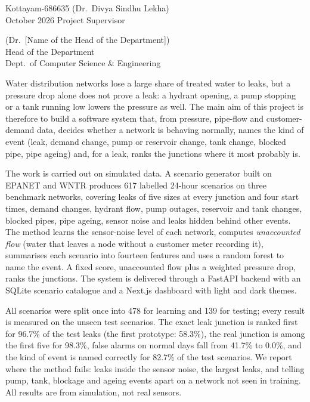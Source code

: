 \documentclass[11pt,letterpaper]{report}
\theoremstyle{definition}
\theoremstyle{plain}
\theoremstyle{remark}
\begin{document}
\noindent Kottayam-686635 \hfill (Dr.\ Divya Sindhu Lekha)\\
October 2026 \hfill Project Supervisor

\vspace{0.9in}
\begin{flushright}
(Dr.\ [Name of the Head of the Department])\\
Head of the Department\\
Dept.\ of Computer Science \& Engineering
\end{flushright}
\clearpage

\begin{center}\vspace*{0.7in}{\large\bfseries ABSTRACT}\end{center}
\vspace{0.1in}
\linespread{1.3}\selectfont
Water distribution networks lose a large share of treated water to leaks, but a pressure drop alone does not prove a leak: a hydrant opening, a pump stopping or a tank running low lowers the pressure as well. The main aim of this project is therefore to build a software system that, from pressure, pipe-flow and customer-demand data, decides whether a network is behaving normally, names the kind of event (leak, demand change, pump or reservoir change, tank change, blocked pipe, pipe ageing) and, for a leak, ranks the junctions where it most probably is.

The work is carried out on simulated data. A scenario generator built on EPANET and WNTR produces 617 labelled 24-hour scenarios on three benchmark networks, covering leaks of five sizes at every junction and four start times, demand changes, hydrant flow, pump outages, reservoir and tank changes, blocked pipes, pipe ageing, sensor noise and leaks hidden behind other events. The method learns the sensor-noise level of each network, computes \emph{unaccounted flow} (water that leaves a node without a customer meter recording it), summarises each scenario into fourteen features and uses a random forest to name the event. A fixed score, unaccounted flow plus a weighted pressure drop, ranks the junctions. The system is delivered through a FastAPI backend with an SQLite scenario catalogue and a Next.js dashboard with light and dark themes.

All scenarios were split once into 478 for learning and 139 for testing; every result is measured on the unseen test scenarios. The exact leak junction is ranked first for 96.7\% of the test leaks (the first prototype: 58.3\%), the real junction is among the first five for 98.3\%, false alarms on normal days fall from 41.7\% to 0.0\%, and the kind of event is named correctly for 82.7\% of the test scenarios. We report where the method fails: leaks inside the sensor noise, the largest leaks, and telling pump, tank, blockage and ageing events apart on a network not seen in training. All results are from simulation, not real sensors.
\clearpage
\end{document}
